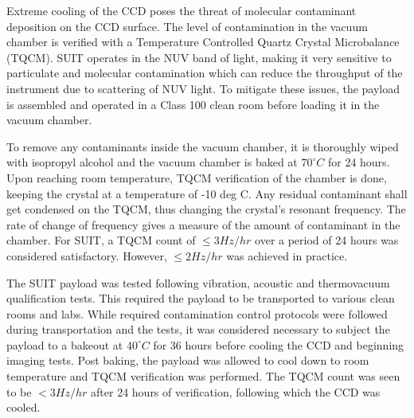 \documentclass[12pt]{spieman}  %
\begin{document}
	Extreme cooling of the CCD poses the threat of molecular contaminant deposition on the CCD surface. The level of contamination in the vacuum chamber is verified with a Temperature Controlled Quartz Crystal Microbalance (TQCM). SUIT operates in the NUV band of light, making it very sensitive to particulate and molecular contamination which can reduce the throughput of the instrument due to scattering of NUV light. To mitigate these issues, the payload is assembled and operated in a Class 100 clean room before loading it in the vacuum chamber.
	
	To remove any contaminants inside the vacuum chamber, it is thoroughly wiped with isopropyl alcohol and the vacuum chamber is baked at  $70^\circ C$ for 24 hours. Upon reaching room temperature, TQCM verification of the chamber is done, keeping the crystal at a temperature of -10 deg C. Any residual contaminant shall get condensed on the TQCM, thus changing the crystal's resonant frequency. The rate of change of frequency gives a measure of the amount of contaminant in the chamber. For SUIT, a TQCM count of $\leq 3 Hz/hr$ over a period of 24 hours was considered satisfactory. However, $\leq 2 Hz/hr$ was achieved in practice.
	
	The SUIT payload was tested following vibration, acoustic and thermovacuum qualification tests. This required the payload to be transported to various clean rooms and labs. While required contamination control protocols were followed during transportation and the tests, it was considered necessary to subject the payload to a bakeout at $40 ^\circ C$ for 36 hours before cooling the CCD and beginning imaging tests. Post baking, the payload was allowed to cool down to room temperature and TQCM verification was performed. The TQCM count was seen to be $< 3 Hz/hr$ after 24 hours of verification, following which the CCD was cooled.
	
\end{document}
